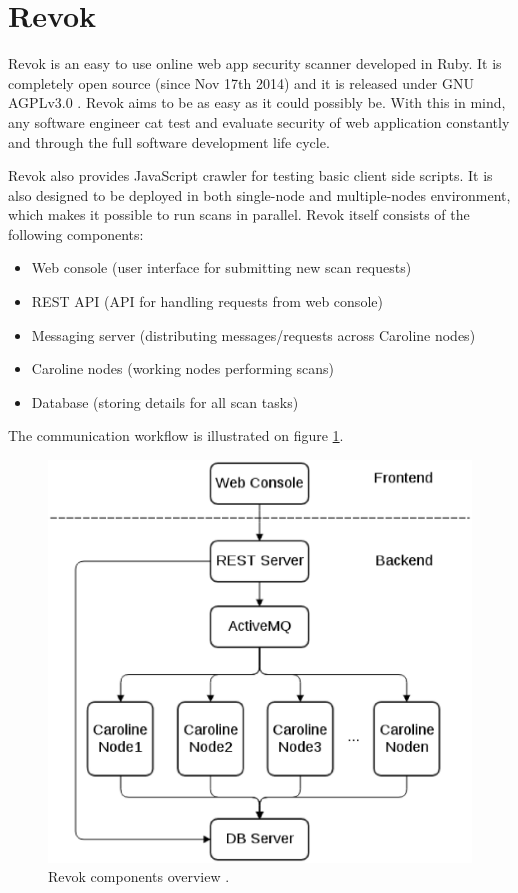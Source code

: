 	\newpage
	\section{Revok}
	
	Revok \cite{Revok} is an easy to use online web app security scanner developed in Ruby. It is completely open source (since Nov 17th 2014) and it is released under GNU AGPLv3.0 \cite{GNUAGPLv3}. Revok aims to be as easy as it could possibly be. With this in mind, any software engineer cat test and evaluate security of web application constantly and through the full software development life cycle.
	
	Revok also provides JavaScript crawler for testing basic client side scripts. It is also designed to be deployed in both single-node and multiple-nodes environment, which makes it possible to run scans in parallel. Revok itself consists of the following components:
	
	\begin{itemize}
		\item Web console (user interface for submitting new scan requests)
		\item REST API (API for handling requests from web console)
		\item Messaging server (distributing messages/requests across Caroline nodes)
		\item Caroline nodes (working nodes performing scans)
		\item Database (storing details for all scan tasks)
	\end{itemize}
	
	The communication workflow is illustrated on figure \ref{fig:revok-structure}.
	
	\begin{figure}[h!]
	  \centering
		  \includegraphics[width=12cm]{fig/revok.eps}
		  \caption{Revok components overview \cite{imgRevokComponents}.}
		  \label{fig:revok-structure}
	\end{figure}
		
